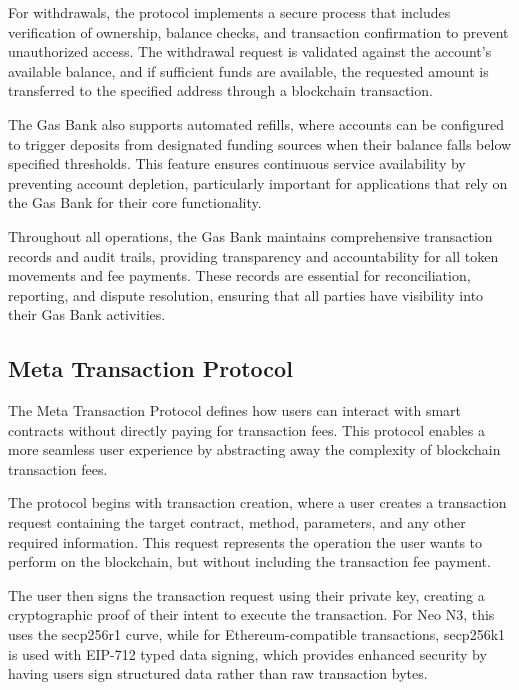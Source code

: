 \documentclass[12pt,a4paper]{article}
\begin{document}
For withdrawals, the protocol implements a secure process that includes verification of ownership, balance checks, and transaction confirmation to prevent unauthorized access. The withdrawal request is validated against the account's available balance, and if sufficient funds are available, the requested amount is transferred to the specified address through a blockchain transaction.

The Gas Bank also supports automated refills, where accounts can be configured to trigger deposits from designated funding sources when their balance falls below specified thresholds. This feature ensures continuous service availability by preventing account depletion, particularly important for applications that rely on the Gas Bank for their core functionality.

Throughout all operations, the Gas Bank maintains comprehensive transaction records and audit trails, providing transparency and accountability for all token movements and fee payments. These records are essential for reconciliation, reporting, and dispute resolution, ensuring that all parties have visibility into their Gas Bank activities.

\subsection{Meta Transaction Protocol}
\label{subsec:meta-tx-protocol-spec}

The Meta Transaction Protocol defines how users can interact with smart contracts without directly paying for transaction fees. This protocol enables a more seamless user experience by abstracting away the complexity of blockchain transaction fees.



The protocol begins with transaction creation, where a user creates a transaction request containing the target contract, method, parameters, and any other required information. This request represents the operation the user wants to perform on the blockchain, but without including the transaction fee payment.

The user then signs the transaction request using their private key, creating a cryptographic proof of their intent to execute the transaction. For Neo N3, this uses the secp256r1 curve, while for Ethereum-compatible transactions, secp256k1 is used with EIP-712 typed data signing, which provides enhanced security by having users sign structured data rather than raw transaction bytes.
\end{document}
